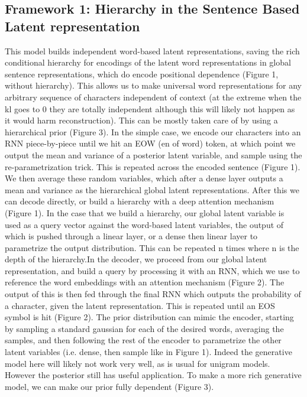 \documentclass[journal, 12pt, draftcls, onecolumn]{IEEEtran}
\begin{document}
\subsection{Framework 1: Hierarchy in the Sentence Based Latent representation}
This model builds independent word-based latent representations, saving the rich conditional hierarchy for encodings of the latent word representations in global sentence representations, which do encode positional dependence (Figure 1, without hierarchy). This allows us to make universal word representations for any arbitrary sequence of characters independent of context (at the extreme when the kl goes to 0 they are totally independent although this will likely not happen as it would harm reconstruction). This can be mostly taken care of by using a hierarchical prior (Figure 3).
In the simple case, we encode our characters into an RNN piece-by-piece until we hit an EOW (en of word) token, at which point we output the mean and variance of a posterior latent variable, and sample using the re-parametrization trick. This is repeated across the encoded sentence (Figure 1). We then average these random variables, which after a dense layer outputs a mean and variance as the hierarchical global latent representations. After this we can decode directly, or build a hierarchy with a deep attention mechanism (Figure 1). In the case that we build a hierarchy, our global latent variable is used as a query vector against the word-based latent variables, the output of which is pushed through a linear layer, or a dense then linear layer to parametrize the output distribution. This can be repeated n times where n is the depth of the hierarchy.In the decoder, we proceed from our global latent representation, and build a query by processing it with an RNN, which we use to reference the word embeddings with an attention mechanism (Figure 2). The output of this is then fed through the final RNN which outputs the probability of a character, given the latent representation. This is repeated until an EOS symbol is hit (Figure 2). The prior distribution can mimic the encoder, starting by sampling a standard gaussian for each of the desired words, averaging the samples, and then following the rest of the encoder to parametrize the other latent variables (i.e. dense, then sample like in Figure 1). Indeed the generative model here will likely not work very well, as is usual for unigram models. However the posterior still has useful application. To make a more rich generative model, we can make our prior fully dependent (Figure 3).
\end{document}
